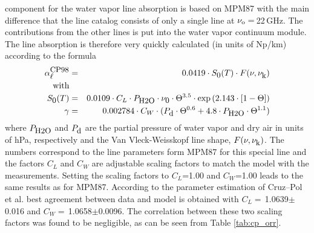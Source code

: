 \label{levele:cp98_h2oline}
component \citep{cruzpol:98} for the water vapor line absorption 
is based on MPM87 with the main difference that the 
line catalog consists of only a single line at $\nu_{\rm o}=$\,22\,GHz. 
The contributions from the other lines is put into the water vapor 
continuum module. The line absorption is therefore very quickly 
calculated (in units of Np/km) according to the formula
\begin{eqnarray}
  \label{eq:cp98:lineabs}
  \alphacpl &=& 0.0419 \cdot \intencp \cdot \shape \\
  \mbox{with} & & \nonumber\\
  \label{eq:cp98:inten}
  \intencp    &=& 0.0109 \cdot C_L \cdot \phzo \cdot \nuo \cdot \Theta^{3.5} 
             \cdot \exp{(2.143\cdot[1-\Theta])}\nonumber\\
%
  \label{eq:cp98:width}
  \gamma &=& 0.002784 \cdot C_W \cdot (\pda \cdot \Theta^{0.6}+ 
             4.8 \cdot \phzo \cdot \Theta^{1.1}) \nonumber\\
\end{eqnarray}
where $P_{\mbox{\rm \small H2O}}$ and $P_{\mbox{\rm \small d}}$ are the partial pressure of water vapor and dry
air in units of hPa, respectively and the Van Vleck-Weisskopf line
shape, $F(\nu,\nu_{\mbox{\rm \small k}})$. The numbers correspond to the line
parameters form MPM87 for this special line and the factors  
$C_L$ and $C_W$ are adjustable scaling factors to match the model with the
measurements. Setting the scaling factors to $C_L$=1.00 and $C_W$=1.00 
leads to the same results as for MPM87. According to the parameter 
estimation of Cruz--Pol et al. best agreement between 
data and model is obtained with $C_L=$\,1.0639$\pm$0.016 and 
$C_W=$\,1.0658$\pm$0.0096. The correlation between these two scaling 
factors was found to be negligible, as can be seen from 
Table \ref{tab:cp_orr}.

